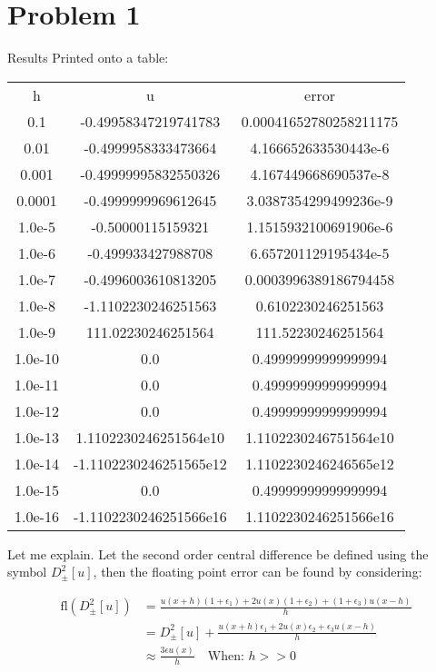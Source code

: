 \documentclass[]{article}
\begin{document}
\section*{Problem 1}

Results Printed onto a table: \\
\begin{center}
    \begin{tabular}{ccc}
        h & u & error\\
        0.1 & -0.49958347219741783 & 0.00041652780258211175\\
        0.01 & -0.4999958333473664 & 4.166652633530443e-6\\
        0.001 & -0.49999995832550326 & 4.167449668690537e-8\\
        0.0001 & -0.4999999969612645 & 3.0387354299499236e-9\\
        1.0e-5 & -0.50000115159321 & 1.1515932100691906e-6\\
        1.0e-6 & -0.499933427988708 & 6.657201129195434e-5\\
        1.0e-7 & -0.4996003610813205 & 0.0003996389186794458\\
        1.0e-8 & -1.1102230246251563 & 0.6102230246251563\\
        1.0e-9 & 111.02230246251564 & 111.52230246251564\\
        1.0e-10 & 0.0 & 0.49999999999999994\\
        1.0e-11 & 0.0 & 0.49999999999999994\\
        1.0e-12 & 0.0 & 0.49999999999999994\\
        1.0e-13 & 1.1102230246251564e10 & 1.1102230246751564e10\\
        1.0e-14 & -1.1102230246251565e12 & 1.1102230246246565e12\\
        1.0e-15 & 0.0 & 0.49999999999999994\\
        1.0e-16 & -1.1102230246251566e16 & 1.1102230246251566e16\\
    \end{tabular}    
\end{center}


\par
Let me explain. Let the second order central difference be defined using the symbol $D_{\pm}^2[u]$, then the floating point error can be found by considering: 

\begin{align*}\tag{1.1}\label{eqn:1.1}
    \text{fl}(D_{\pm}^2[u])  &= 
    \frac{
        u(x + h)(1 + \epsilon_1) +
        2u(x)(1 + \epsilon_2) + 
        (1 + \epsilon_3)u(x - h)
    }{h}
    \\
    &= 
    D_{\pm}^2[u] + \frac{
        u(x + h)\epsilon_1 + 2u(x)\epsilon_2 + \epsilon_3u(x - h)
        }{
            h
        }
    \\
    & \approx \frac{3\epsilon u(x)}{h} \quad \text{When: }h >> 0
\end{align*}
\end{document}
